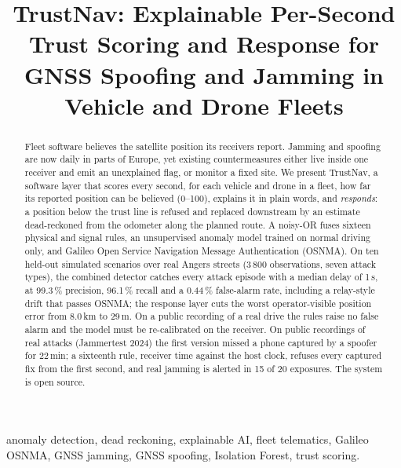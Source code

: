 \documentclass[conference]{IEEEtran}
\newcommand{\sys}{TrustNav}
\begin{document}
\title{\sys: Explainable Per-Second Trust Scoring and Response for GNSS Spoofing and Jamming in Vehicle and Drone Fleets}

\author{
}

\maketitle

\begin{abstract}
Fleet software believes the satellite position its receivers report. Jamming and spoofing are now daily in parts of Europe, yet existing countermeasures either live inside one receiver and emit an unexplained flag, or monitor a fixed site. We present \sys, a software layer that scores every second, for each vehicle and drone in a fleet, how far its reported position can be believed (0--100), explains it in plain words, and \emph{responds}: a position below the trust line is refused and replaced downstream by an estimate dead-reckoned from the odometer along the planned route. A noisy-OR fuses sixteen physical and signal rules, an unsupervised anomaly model trained on normal driving only, and Galileo Open Service Navigation Message Authentication (OSNMA). On ten held-out simulated scenarios over real Angers streets (3\,800 observations, seven attack types), the combined detector catches every attack episode with a median delay of 1\,s, at 99.3\,\% precision, 96.1\,\% recall and a 0.44\,\% false-alarm rate, including a relay-style drift that passes OSNMA; the response layer cuts the worst operator-visible position error from 8.0\,km to 29\,m. On a public recording of a real drive the rules raise no false alarm and the model must be re-calibrated on the receiver. On public recordings of real attacks (Jammertest 2024) the first version missed a phone captured by a spoofer for 22\,min; a sixteenth rule, receiver time against the host clock, refuses every captured fix from the first second, and real jamming is alerted in 15 of 20 exposures. The system is open source.
\end{abstract}

\begin{IEEEkeywords}
anomaly detection, dead reckoning, explainable AI, fleet telematics, Galileo OSNMA, GNSS jamming, GNSS spoofing, Isolation Forest, trust scoring.
\end{IEEEkeywords}
\end{document}
